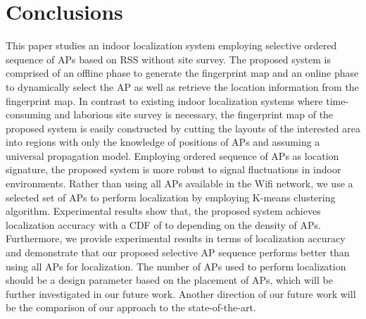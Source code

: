 \documentclass[10pt, conference, letterpaper]{IEEEtran}
\begin{document}
\vspace{-0.1in}
\section{Conclusions}
\label{section:conclusion}
This paper studies an indoor localization system employing selective ordered sequence of APs based on RSS without site survey. 
The proposed system is comprised of an offline phase to generate the fingerprint map and an online phase to dynamically select the AP as well as retrieve the location information from the fingerprint map. 
In contrast to existing indoor localization systems where time-consuming and laborious site survey is necessary, 
the fingerprint map of the proposed system is easily constructed by cutting the layouts of the interested area into regions with only the knowledge of positions of APs 
and assuming a universal propagation model. 
Employing ordered sequence of APs as location signature, the proposed system is more robust to signal fluctuations in indoor environments. 
Rather than using all APs available in the Wifi network, we use a selected set of APs to perform localization by employing K-means clustering algorithm. 
Experimental results show that, the proposed system achieves localization accuracy  with a CDF of  to  depending on the density of APs. 
Furthermore, we provide experimental results in terms of localization accuracy and demonstrate that our proposed selective AP sequence performs better than using all APs for localization. 
The number of APs used to perform localization should be a design parameter based on the placement of APs, which will be further investigated in our future work. 
Another direction of our future work will be the comparison of our approach to the state-of-the-art.


\vspace{-0.1in}
\end{document}
